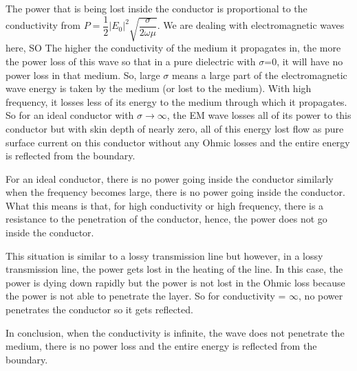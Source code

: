 The power that is being lost inside the conductor is proportional to the conductivity from $P=\dfrac{1}{2}\lvert E_{0}\rvert^{2}\sqrt{\dfrac{\sigma}{2\omega\mu}}$.
We are dealing with electromagnetic waves here, SO The higher the conductivity of the medium it propagates in, the more the power loss of this wave so that in a pure dielectric with $\sigma$=0, it will have no power loss in that medium. So, large $\sigma$ means a large part of the electromagnetic wave energy is taken by the medium (or lost to the medium). With high frequency, it losses less of its energy to the medium through which it propagates. So for an ideal conductor with $\sigma\longrightarrow\infty$, the EM wave losses all of its power to this conductor but with skin depth of nearly zero, all of this energy lost flow as pure surface current on this conductor without any Ohmic losses and the entire energy is reflected from the boundary.


For an ideal conductor, there is no power going inside the conductor similarly when the frequency becomes large, there is no power going inside the conductor. What this means is that, for high conductivity or high frequency, there is a resistance to the penetration of the conductor, hence, the power does not go inside the conductor.

This situation is similar to a lossy transmission line but however, in a lossy transmission line, the power gets lost in the heating of the line. In this case, the power is dying down rapidly but the power is not lost in the Ohmic loss because the power is not able to penetrate the layer. So for conductivity = $\infty$, no power penetrates the conductor so it gets reflected.

In conclusion, when the conductivity is infinite, the wave does not penetrate the medium, there is no power loss and the entire energy is reflected from the boundary.

